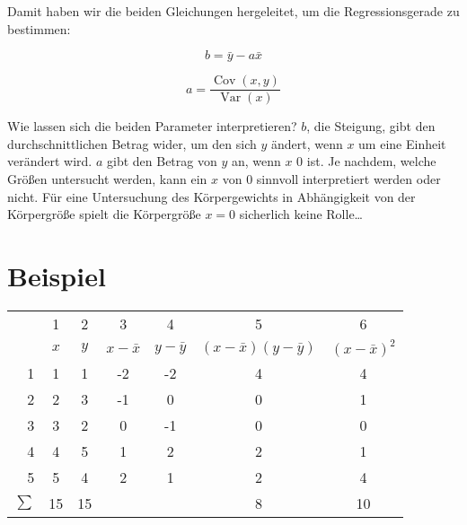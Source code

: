 \documentclass[ngerman, 12pt]{scrartcl}
\DeclareMathOperator{\cov}{Cov}
\DeclareMathOperator{\var}{Var}
\begin{document}
Damit haben wir die beiden Gleichungen hergeleitet, um die Regressionsgerade zu bestimmen:

\begin{equation}
b=\bar{y} - a \bar{x}
\end{equation}


\begin{equation}
a =  \dfrac{\cov(x,y)}{\var(x)}
\end{equation}

Wie lassen sich die beiden Parameter interpretieren? \(b\), die Steigung, gibt den durchschnittlichen Betrag wider, um den sich \(y\) ändert, wenn \(x\) um eine Einheit verändert wird. \(a\) gibt den Betrag von \(y\) an, wenn \(x\) 0 ist. Je nachdem, welche Größen untersucht werden, kann ein \(x\) von 0 sinnvoll interpretiert werden oder nicht. Für eine Untersuchung des  Körpergewichts in Abhängigkeit von der Körpergröße spielt die Körpergröße \(x=0\) sicherlich keine Rolle\ldots    

\section{Beispiel}

\begin{center}
\begin{tabular}{r|cccccc} \toprule
& 1 & 2 & 3 & 4 & 5 & 6 \\
& $x$	&	$y$	&	$x-\bar{x}$	&	$y-\bar{y}$	&	$(x-\bar{x})(y-\bar{y})$	&	$(x-\bar{x})^2$	\\ \midrule
1 & 1	&	1	&	-2	&	-2	&	4	&	4	\\
2 & 2	&	3	&	-1	&	0	&	0	&	1	\\
3 & 3	&	2	&	0	&	-1	&	0	&	0	\\
4 & 4	&	5	&	1	&	2	&	2	&	1	\\
5 & 5	&	4	&	2	&	1	&	2	&	4	\\  \midrule
$\sum$ & 15 & 15 & & & 8 & 10 \\ \bottomrule
\end{tabular}
\end{center}

%
\end{document}
